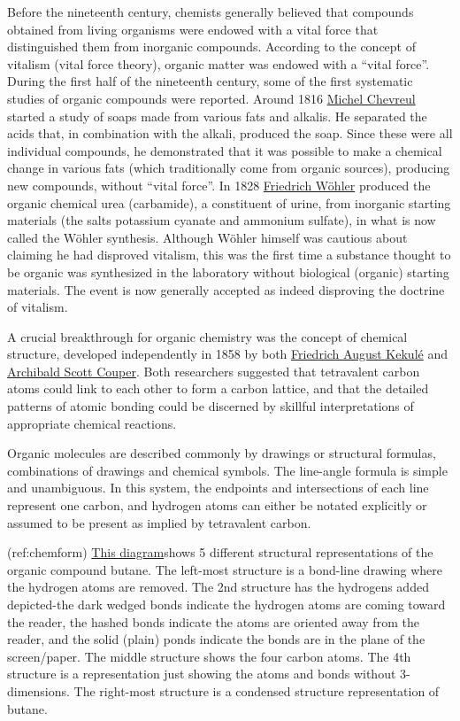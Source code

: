 Before the nineteenth century, chemists generally believed that
compounds obtained from living organisms were endowed with a vital force
that distinguished them from inorganic compounds. According to the
concept of vitalism (vital force theory), organic matter was endowed
with a ``vital force''. During the first half of the nineteenth century,
some of the first systematic studies of organic compounds were reported.
Around 1816
\href{https://en.wikipedia.org/wiki/Michel_Eugène_Chevreul}{Michel
Chevreul} started a study of soaps made from various fats and alkalis.
He separated the acids that, in combination with the alkali, produced
the soap. Since these were all individual compounds, he demonstrated
that it was possible to make a chemical change in various fats (which
traditionally come from organic sources), producing new compounds,
without ``vital force''. In 1828
\href{https://en.wikipedia.org/wiki/Friedrich_Wöhler}{Friedrich Wöhler}
produced the organic chemical urea (carbamide), a constituent of urine,
from inorganic starting materials (the salts potassium cyanate and
ammonium sulfate), in what is now called the Wöhler synthesis. Although
Wöhler himself was cautious about claiming he had disproved vitalism,
this was the first time a substance thought to be organic was
synthesized in the laboratory without biological (organic) starting
materials. The event is now generally accepted as indeed disproving the
doctrine of vitalism.

A crucial breakthrough for organic chemistry was the concept of chemical
structure, developed independently in 1858 by both
\href{https://en.wikipedia.org/wiki/August_Kekulé}{Friedrich August
Kekulé} and
\href{https://en.wikipedia.org/wiki/Archibald_Scott_Couper}{Archibald
Scott Couper}. Both researchers suggested that tetravalent carbon atoms
could link to each other to form a carbon lattice, and that the detailed
patterns of atomic bonding could be discerned by skillful
interpretations of appropriate chemical reactions.

Organic molecules are described commonly by drawings or structural
formulas, combinations of drawings and chemical symbols. The line-angle
formula is simple and unambiguous. In this system, the endpoints and
intersections of each line represent one carbon, and hydrogen atoms can
either be notated explicitly or assumed to be present as implied by
tetravalent carbon.

(ref:chemform)
\href{https://commons.wikimedia.org/wiki/File:Stuctural_drawings_of_butane_854px.jpg}{This
diagram}shows 5 different structural representations of the organic
compound butane. The left-most structure is a bond-line drawing where
the hydrogen atoms are removed. The 2nd structure has the hydrogens
added depicted-the dark wedged bonds indicate the hydrogen atoms are
coming toward the reader, the hashed bonds indicate the atoms are
oriented away from the reader, and the solid (plain) ponds indicate the
bonds are in the plane of the screen/paper. The middle structure shows
the four carbon atoms. The 4th structure is a representation just
showing the atoms and bonds without 3-dimensions. The right-most
structure is a condensed structure representation of butane.

